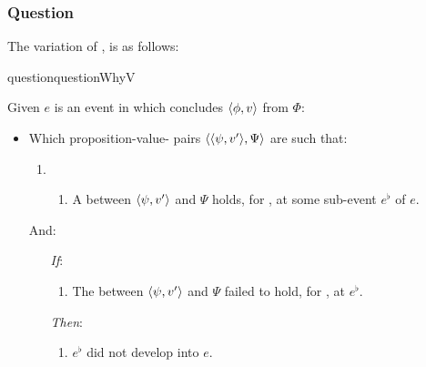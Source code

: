 \subsubsection{Question}
\label{cha:var:sec:vars:qwhyvnp:question}

\begin{note}
  The variation of \qWhy{}, \qWhyV{} is as follows:

  \begin{restatable}[\qWhyV{}]{question}{questionWhyV}
    \label{q:why:v}

    Given \(e\) is an event in which \vAgent{} concludes \(\langle \phi, v \rangle\) from \(\Phi\):

    \begin{itemize}
    \item
      Which proposition-value-\poP{} pairs \(\langle \langle \psi, v' \rangle, \Psi \rangle\) are such that:

      \begin{enumerate}[label=]
      \item
        \begin{enumerate}[label=\alph*., ref=(\alph*), series=qWhyVdef]
        \item
          \label{q:why:v:a}
          A  between \(\langle \psi, v' \rangle\) and \(\Psi\) holds, for \vAgent{}, at some sub-event \(e^{\flat}\) of \(e\).
        \end{enumerate}
      \end{enumerate}
      And:
      \begin{enumerate}
      \item[\emph{If}:]
        \begin{enumerate}[label=\alph*., ref=(\alph*), resume*=qWhyVdef]
        \item
          \label{q:why:v:if}
          The  between \(\langle \psi, v' \rangle\) and \(\Psi\) failed to hold, for \vAgent{}, at \(e^{\flat}\).
        \end{enumerate}
      \item[\emph{Then}:]
        \begin{enumerate}[label=\alph*., ref=(\alph*), resume*=qWhyVdef]
        \item
          \label{q:why:v:then}
          \(e^{\flat}\) did not develop into \(e\).
        \end{enumerate}
      \end{enumerate}
    \end{itemize}
    \vspace{-\baselineskip}
  \end{restatable}


\end{note}
